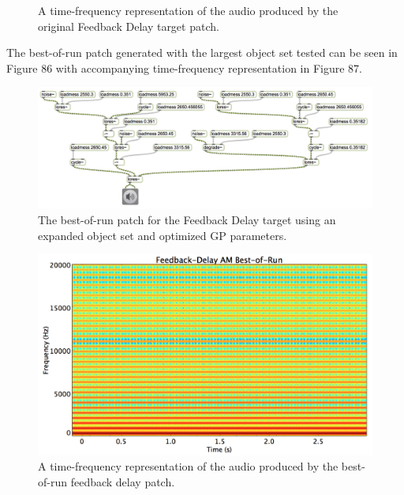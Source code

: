 \documentclass[12pt]{report} 	%
\numberwithin{figure}{chapter}
\numberwithin{table}{chapter}
\numberwithin{equation}{chapter}
\begin{document}
\begin{flushleft}
\begin{figure}[h!]
\begin{center}
\caption[Original feedback delay time-frequency representation]{A time-frequency representation of the audio produced by the original Feedback Delay target patch.}
\end{center}
\end{figure}

The best-of-run patch generated with the largest object set tested can be seen in Figure 86 with accompanying time-frequency representation in Figure 87.
\begin{figure}[h!]
\begin{center}
\includegraphics[angle=270, scale=0.60]{DelayFeedbackAM_Best}
\caption[Feedback delay best-of-run patch]{The best-of-run patch for the Feedback Delay target using an expanded object set and optimized GP parameters.}
\end{center}
\end{figure}
\begin{figure}[h!]
\begin{center}
\includegraphics[scale=0.35,width=\linewidth]{FeedbackDelayAMBestOfRunSTFT}
\caption[Best-of-run feedback delay time-frequency representation]{A time-frequency representation of the audio produced by the best-of-run feedback delay patch.}
\end{center}
\end{figure}


\end{flushleft}
\end{document}
